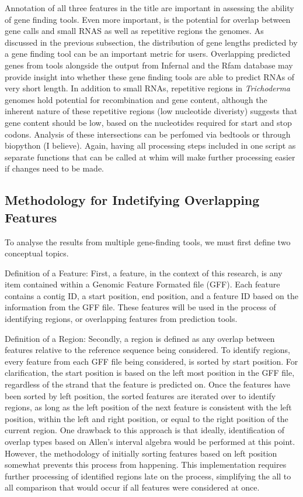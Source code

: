 Annotation of all three features in the title are important in
assessing the ability of gene finding tools. Even more important, is
the potential for overlap between gene calls and small RNAS as
well as repetitive regions the genomes. As discussed in the previous
subsection, the distribution of gene lengths predicted by a gene
finding tool can be an important metric for users. Overlapping
predicted genes from tools alongside the output from Infernal and the
Rfam database may provide insight into whether these gene
finding tools are able to predict RNAs of very short length. In
addition to small RNAs, repetitive regions in \textit{Trichoderma}
genomes hold potential for recombination and gene content, although
the inherent nature of these repetitive regions (low nucleotide
diveristy) suggests that gene content should be low, based on the
nucleotides required for start and stop codons. Analysis of these
intersections can be perfomed via bedtools or through biopython (I
believe). Again, having all processing steps included in one script as
separate functions that can be called at whim will make further
processing easier if changes need to be made.

\subsection{Methodology for Indetifying Overlapping Features}

To analyse the results from multiple gene-finding tools, we must first
define two conceptual topics.

Definition of a Feature: First, a feature, in the context of this
research, is any item contained within a Genomic Feature Formated file
(GFF). Each feature contains a contig ID, a start position, end
position, and a feature ID based on the information from the GFF
file. These features will be used in the process of identifying
regions, or overlapping features from prediction tools.

Definition of a Region: Secondly, a region is defined as any overlap
between features relative to the reference sequence being
considered. To identify regions, every feature from each GFF file
being considered, is sorted by start position. For clarification, the
start position is based on the left most position in the GFF file,
regardless of the strand that the feature is predicted on. Once the
features have been sorted by left position, the sorted features are
iterated over to identify regions, as long as the left position of the
next feature is consistent with the left position, within the left
and right position, or equal to the right position of the current
region. One drawback to this approach is that ideally, identification
of overlap types based on Allen's interval algebra would be performed
at this point. However, the methodology of initially sorting features
based on left position somewhat prevents this process from
happening. This implementation requires further processing of
identified regions late on the process, simplifying the all to all
comparison that would occur if all features were considered at once.

